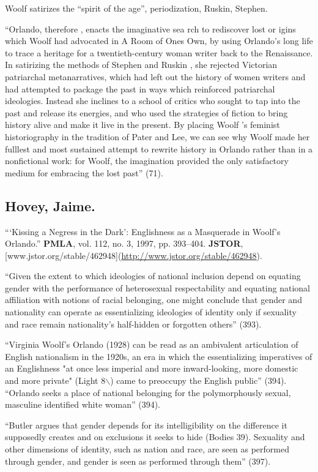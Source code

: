 \documentclass[11pt]{article}
\begin{document}
Woolf satirizes the “spirit of the age”, periodization, Ruskin,
Stephen.

“Orlando, therefore , enacts the imaginative sea rch to rediscover
lost or igins which Woolf had advocated in A Room of Ones Own, by
using Orlando's long life to trace a heritage for a twentieth-century
woman writer back to the Renaissance. In satirizing the methods of
Stephen and Ruskin , she rejected Victorian patriarchal
metanarratives, which had left out the history of women writers and
had attempted to package the past in ways which reinforced patriarchal
ideologies. Instead she inclines to a school of critics who sought to
tap into the past and release its energies, and who used the
strategies of fiction to bring history alive and make it live in the
present. By placing Woolf 's feminist historiography in the tradition
of Pater and Lee, we can see why Woolf made her fulllest and most
sustained attempt to rewrite history in Orlando rather than in a
nonfictional work: for Woolf, the imagination provided the only
satisfactory medium for embracing the lost past” (71).

\subsection{Hovey, Jaime.}
\label{sec:org1877429}
“‘Kissing a Negress in the Dark’: Englishness as a Masquerade in
Woolf's Orlando.” \textbf{PMLA}, vol. 112, no. 3, 1997, pp. 393–404. \textbf{JSTOR},
[www.jstor.org/stable/462948](\url{http://www.jstor.org/stable/462948}).

“Given the extent to which ideologies of national inclusion depend on
equating gender with the performance of heterosexual respectability
and equating national affiliation with notions of racial belonging,
one might conclude that gender and nationality can operate as
essentializing ideologies of identity only if sexuality and race
remain nationality's half-hidden or forgotten others” (393).

“Virginia Woolf's Orlando (1928) can be read as an ambivalent
articulation of English nationalism in the 1920s, an era in which the
essentializing imperatives of an Englishness "at once less imperial
and more inward-looking, more domestic and more private" (Light 8$\backslash$)
came to preoccupy the English public” (394). “Orlando seeks a place of
national belonging for the polymorphously sexual, masculine identified
white woman” (394).

“Butler argues that gender depends for its intelligibility on the
difference it supposedly creates and on exclusions it seeks to hide
(Bodies 39). Sexuality and other dimensions of identity, such as
nation and race, are seen as performed through gender, and gender is
seen as performed through them” (397).
\end{document}
